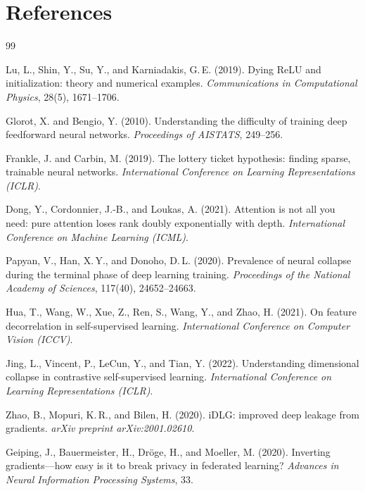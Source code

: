 \documentclass{article}
\begin{document}
\begin{ack}
\end{ack}

\section*{References}
{\small
\begin{thebibliography}{99}

Lu, L., Shin, Y., Su, Y., and Karniadakis, G.\,E. (2019).
Dying ReLU and initialization: theory and numerical examples.
\textit{Communications in Computational Physics}, 28(5), 1671--1706.

Glorot, X. and Bengio, Y. (2010).
Understanding the difficulty of training deep feedforward neural networks.
\textit{Proceedings of AISTATS}, 249--256.

Frankle, J. and Carbin, M. (2019).
The lottery ticket hypothesis: finding sparse, trainable neural networks.
\textit{International Conference on Learning Representations (ICLR)}.

Dong, Y., Cordonnier, J.-B., and Loukas, A. (2021).
Attention is not all you need: pure attention loses rank doubly
exponentially with depth.
\textit{International Conference on Machine Learning (ICML)}.

Papyan, V., Han, X.\,Y., and Donoho, D.\,L. (2020).
Prevalence of neural collapse during the terminal phase of deep learning
training.
\textit{Proceedings of the National Academy of Sciences}, 117(40),
24652--24663.

Hua, T., Wang, W., Xue, Z., Ren, S., Wang, Y., and Zhao, H. (2021).
On feature decorrelation in self-supervised learning.
\textit{International Conference on Computer Vision (ICCV)}.

Jing, L., Vincent, P., LeCun, Y., and Tian, Y. (2022).
Understanding dimensional collapse in contrastive self-supervised learning.
\textit{International Conference on Learning Representations (ICLR)}.

Zhao, B., Mopuri, K.\,R., and Bilen, H. (2020).
iDLG: improved deep leakage from gradients.
\textit{arXiv preprint arXiv:2001.02610}.

Geiping, J., Bauermeister, H., Dr\"oge, H., and Moeller, M. (2020).
Inverting gradients---how easy is it to break privacy in federated
learning?
\textit{Advances in Neural Information Processing Systems}, 33.


\end{thebibliography}}
\end{document}
